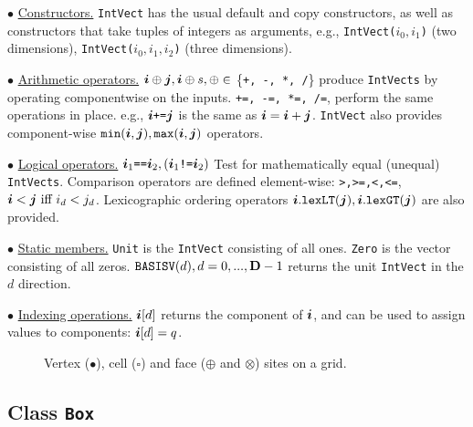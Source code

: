 \begin{trivlist}

\item $\bullet$ \underline{Constructors.}
{\tt IntVect} has the usual default and copy constructors, as well as
constructors that take tuples of integers as arguments, e.g.,
{\tt IntVect($i_0,i_1$)} (two dimensions), 
{\tt IntVect($i_0,i_1,i_2$)} (three dimensions).

\item $\bullet$ \underline{Arithmetic operators.}
${\boldsymbol{i}} \oplus {\boldsymbol{j}}, {\boldsymbol{i}} \oplus s, \oplus \in$ \{{\tt{+, -, *, /}}\}
produce {\tt{IntVects}} by operating componentwise on the inputs.  {\tt{+=, -=, *=, /=}}, perform the same operations in
place. e.g., ${\boldsymbol{i}} \mbox{\tt{+=}} {\boldsymbol{j}}$ is the same as ${\boldsymbol{i}} = {\boldsymbol{i}} + {\boldsymbol{j}}$.  {\tt{IntVect}} also provides component-wise ${\tt{min}}({\boldsymbol{i}}, {\boldsymbol{j}}), {\tt{max}}({\boldsymbol{i}}, {\boldsymbol{j}})$ operators.

\item $\bullet$ \underline{Logical operators.}
${\boldsymbol{i}}_1 \mbox{{\tt{==}}} {\boldsymbol{i}}_2, ({\boldsymbol{i}}_1 \mbox{{\tt{!=}}} {\boldsymbol{i}}_2)$ Test for mathematically
equal (unequal) {\tt{IntVects}}.  Comparison operators are defined
element-wise:  {\tt{>,>=,<,<=}}, ${\boldsymbol{i}}<{\boldsymbol{j}} \mbox{ iff } i_d<j_d$.  Lexicographic ordering operators ${\tt{{\boldsymbol{i}}.lexLT({\boldsymbol{j}})}},
{\tt{{\boldsymbol{i}}.lexGT({\boldsymbol{j}})}}$ are also provided.

\item $\bullet$ \underline{Static members.}
{\tt{Unit}} is the {\tt{IntVect}} consisting of all
ones. {\tt{Zero}} is the vector consisting of all zeros.
${\tt{BASISV}}(d), d=0, ..., {\mathbf{D}}-1$ returns the unit {\tt{IntVect}} in the $d$
direction.

\item $\bullet$ \underline{Indexing operations.}
${\boldsymbol{i}}[d]$ returns the component of ${\boldsymbol{i}}$, and can
be used to assign values to components:  ${\boldsymbol{i}}[d] = q$.
\end{trivlist}

\begin{figure}
\vspace*{2in}
\caption{Vertex ($\bullet$), cell ($\square$) and face ($\oplus$ and $\otimes$)
sites on a grid.
}
\label{fig:grid}
\end{figure}


\subsection{Class {\tt Box}}
\label{sec:box}

